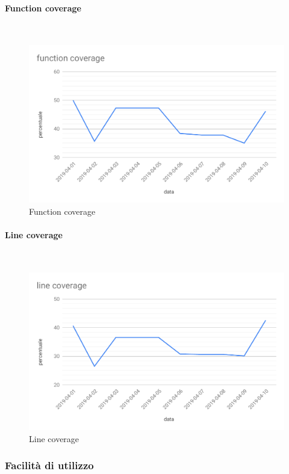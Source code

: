 \paragraph{Function coverage}\mbox{}\\
\begin{figure}[H]
	\centering
	\includegraphics[scale=0.6]{res/images/RQ/function-coverage-RQ.pdf}
	\caption{Function coverage}
\end{figure}
\paragraph{Line coverage}\mbox{}\\
\begin{figure}[H]
	\centering
	\includegraphics[scale=0.6]{res/images/RQ/line-coverage-RQ.pdf}
	\caption{Line coverage}
\end{figure}

\subsubsection{Facilità di utilizzo}

